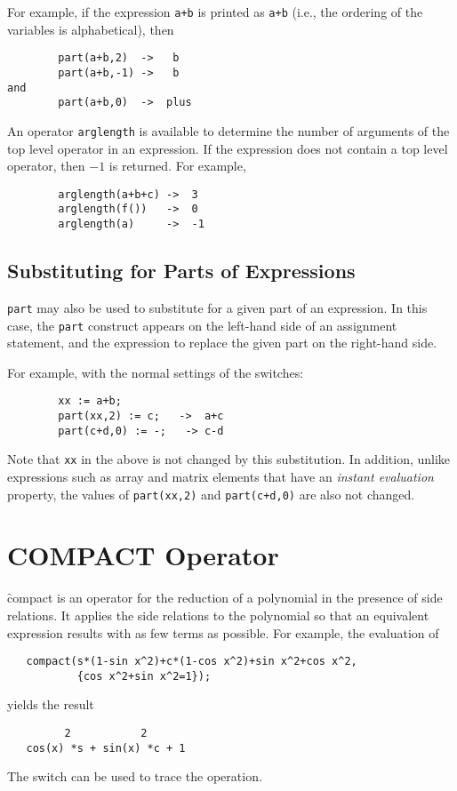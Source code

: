 For example, if the expression \texttt{a+b} is printed as \texttt{a+b} (i.e.,
the ordering of the variables is alphabetical), then
\begin{verbatim}
        part(a+b,2)  ->   b
        part(a+b,-1) ->   b
and
        part(a+b,0)  ->  plus
\end{verbatim}
\hypertarget{operator:ARGLENGTH}{}
An operator \texttt{arglength} is available to determine
the number of arguments of the top level operator in an expression.  If
the expression does not contain a top level operator, then $-1$ is returned.
For example,
\begin{verbatim}
        arglength(a+b+c) ->  3
        arglength(f())   ->  0
        arglength(a)     ->  -1
\end{verbatim}

\subsection{Substituting for Parts of Expressions}

\texttt{part} may also be used to substitute for a given part of an
expression.  In this case, the \texttt{part} construct appears on the
left-hand side of an assignment statement, and the expression to replace
the given part on the right-hand side.

For example, with the normal settings of the {\REDUCE} switches:
\begin{verbatim}
        xx := a+b;
        part(xx,2) := c;   ->  a+c
        part(c+d,0) := -;   -> c-d
\end{verbatim}

Note that \texttt{xx} in the above is not changed by this substitution.  In
addition, unlike expressions such as array and matrix elements that have
an \emph{instant evaluation\/} property, the values
of \texttt{part(xx,2)} and \texttt{part(c+d,0)} are also not changed.


\section{COMPACT Operator}
\label{sec:COMPACT}

\f{compact} is an operator for the reduction of a polynomial in the
presence of side relations.  It applies the side relations to the
polynomial so that an equivalent expression results with as few terms as
possible.  For example, the evaluation of
\begin{verbatim}
   compact(s*(1-sin x^2)+c*(1-cos x^2)+sin x^2+cos x^2,
           {cos x^2+sin x^2=1});
\end{verbatim}
yields the result
\begin{verbatim}
         2           2
   cos(x) *s + sin(x) *c + 1
\end{verbatim}
\hypertarget{switch:TRCOMPACT}{}
The switch  can be used to trace the operation.


